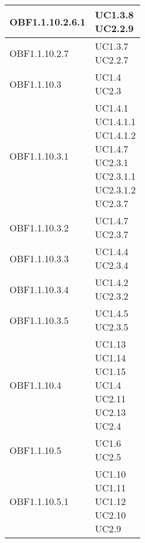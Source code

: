 \documentclass{scalatekids-article}
\begin{document}
\begin{longtable}[H]{|p{5.5cm}|p{5.5cm}|}
\hline
OBF1.1.10.2.6.1 & \multiLineCell[t]{UC1.3.8\\UC2.2.9\\}\\
\hline
OBF1.1.10.2.7 & \multiLineCell[t]{UC1.3.7\\UC2.2.7\\}\\
\hline
OBF1.1.10.3 & \multiLineCell[t]{UC1.4\\UC2.3\\}\\
\hline
OBF1.1.10.3.1 & \multiLineCell[t]{UC1.4.1\\UC1.4.1.1\\UC1.4.1.2\\UC1.4.7\\UC2.3.1\\UC2.3.1.1\\UC2.3.1.2\\UC2.3.7\\}\\
\hline
OBF1.1.10.3.2 & \multiLineCell[t]{UC1.4.7\\UC2.3.7\\}\\
\hline
OBF1.1.10.3.3 & \multiLineCell[t]{UC1.4.4\\UC2.3.4\\}\\
\hline
OBF1.1.10.3.4 & \multiLineCell[t]{UC1.4.2\\UC2.3.2\\}\\
\hline
OBF1.1.10.3.5 & \multiLineCell[t]{UC1.4.5\\UC2.3.5\\}\\
\hline
OBF1.1.10.4 & \multiLineCell[t]{UC1.13\\UC1.14\\UC1.15\\UC1.4\\UC2.11\\UC2.13\\UC2.4\\}\\
\hline
OBF1.1.10.5 & \multiLineCell[t]{UC1.6\\UC2.5\\}\\
\hline
OBF1.1.10.5.1 & \multiLineCell[t]{UC1.10\\UC1.11\\UC1.12\\UC2.10\\UC2.9\\}\\

\end{longtable}
\end{document}
